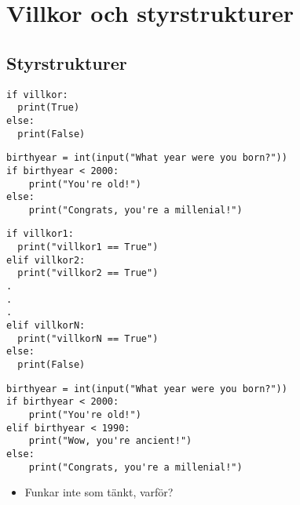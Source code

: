 \section{Villkor och styrstrukturer}

\subsection{Styrstrukturer}

\begin{frame}[fragile]
    \begin{verbatim}
if villkor:
  print(True)
else:
  print(False)
  \end{verbatim}
\end{frame}

\begin{frame}[fragile]
  \begin{example}
    \begin{verbatim}
birthyear = int(input("What year were you born?"))
if birthyear < 2000:
    print("You're old!")
else:
    print("Congrats, you're a millenial!")
    \end{verbatim}
  \end{example}
\end{frame}

\begin{frame}[fragile]
    \begin{verbatim}
if villkor1:
  print("villkor1 == True")
elif villkor2:
  print("villkor2 == True")
.
.
.
elif villkorN:
  print("villkorN == True")
else:
  print(False)
  \end{verbatim}
\end{frame}

\begin{frame}[fragile]
  \begin{example}
    \begin{verbatim}
birthyear = int(input("What year were you born?"))
if birthyear < 2000:
    print("You're old!")
elif birthyear < 1990:
    print("Wow, you're ancient!")
else:
    print("Congrats, you're a millenial!")
    \end{verbatim}
  \end{example}

  \pause

  \begin{question}
    \begin{itemize}
      \item Funkar inte som tänkt, varför?
    \end{itemize}
  \end{question}
\end{frame}


